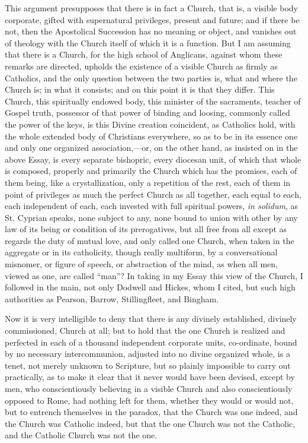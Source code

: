 This argument presupposes that there is in fact a Church, that is,
a visible body corporate, gifted with supernatural privileges, present
and future; and if there be not, then the Apostolical Succession has
no meaning or object, and vanishes out of theology with the Church
itself of which it is a function. But I am assuming that there is a
Church, for the high school of Anglicans, against whom these remarks
are directed, upholds the existence of a visible Church as firmly as
Catholics, and the only question between the two parties is, what and
where the Church is; in what it consists; and on this point it is that
they differ. This Church, this spiritually endowed body, this minister
of the sacraments, teacher of Gospel truth, possessor of that power of
binding and loosing, commonly called the power of the keys, is this
Divine creation coincident, as Catholics hold, with the whole extended
body of Christians everywhere, so as to be in its essence one and only
one organized association,—or, on the other hand, as insisted on in
the above Essay, is every separate bishopric, every diocesan unit, of
which that whole is composed, properly and primarily the Church which
has the promises, each of them being, like a crystallization, only a
repetition of the rest, each of them in point of privileges as much
the perfect Church as all together, each equal to each, each
independent of each, each invested with full spiritual powers, \emph{in
solidum}, as St. Cyprian speaks, none subject to any, none bound to
union with other by any law of its being or condition of its
prerogatives, but all free from all except as regards the duty of
mutual love, and only called one Church, when taken in the aggregate
or in its catholicity, though really multiform, by a conversational
misnomer, or figure of speech, or abstraction of the mind, as when all
men, viewed as one, are called ``man''? In taking in my Essay
this view of the Church, I followed in the main, not only Dodwell and
Hickes, whom I cited, but such high authorities as Pearson, Barrow,
Stillingfleet, and Bingham.

Now it is very intelligible to deny that there is any divinely
established, divinely commissioned, Church at all; but to hold that
the one Church is realized and perfected in each of a thousand
independent corporate units, co-ordinate, bound by no necessary
intercommunion, adjusted into no divine organized whole, is a tenet,
not merely unknown to Scripture, but so plainly impossible to carry
out practically, as to make it clear that it never would have been
devised, except by men, who conscientiously believing in a visible
Church and also conscientiously opposed to Rome, had nothing left for
them, whether they would or would not, but to entrench themselves in
the paradox, that the Church was one indeed, and the Church was
Catholic indeed, but that the one Church was not the Catholic, and the
Catholic Church was not the one.

